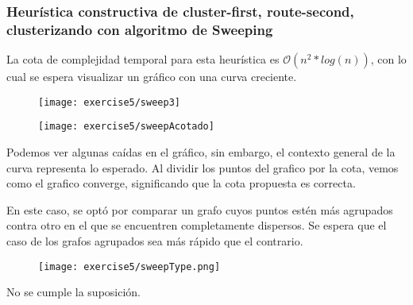 \subsubsection{Heurística constructiva de cluster-first, route-second, clusterizando con algoritmo de Sweeping}


La cota de complejidad temporal para esta heurística es $\mathcal{O}(n^{2} * log(n))$, con lo cual se espera visualizar un gráfico con una curva creciente.

\begin{figure}[H]
	\centering
	\begin{minipage}[t]{.45\textwidth}
		\centering
		\texttt{[image: exercise5/sweep3]}
	\end{minipage}\qquad
	\begin{minipage}[t]{.45\textwidth}
		\centering
		\texttt{[image: exercise5/sweepAcotado]}
	\end{minipage}
\end{figure}

Podemos ver algunas caídas en el gráfico, sin embargo, el contexto general de la curva representa lo esperado. Al dividir los puntos del grafico por la cota, vemos como el grafico converge, significando que la cota propuesta es correcta.



En este caso, se optó por comparar un grafo cuyos puntos estén más agrupados contra otro en el que se encuentren completamente dispersos. Se espera que el caso de los grafos agrupados sea más rápido que el contrario.

\begin{figure}[H]
	\centering
	\texttt{[image: exercise5/sweepType.png]}
\end{figure}


No se cumple la suposición.